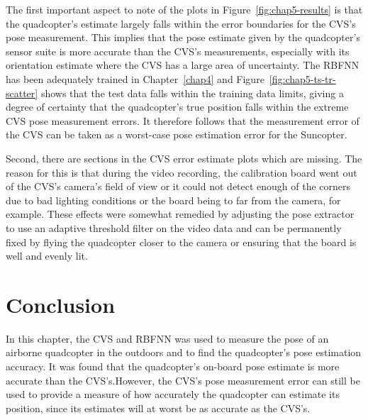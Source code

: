 The first important aspect to note of the plots in Figure~\ref{fig:chap5-results} is that the quadcopter's estimate largely falls within the error boundaries for the CVS's pose measurement. This implies that the pose estimate given by the quadcopter's sensor suite is more accurate than the CVS's measurements, especially with its orientation estimate where the CVS has a large area of uncertainty. The RBFNN has been adequately trained in Chapter~\ref{chap4} and Figure~\ref{fig:chap5-ts-tr-scatter} shows that the test data falls within the training data limits, giving a degree of certainty that the quadcopter's true position falls within the extreme CVS pose measurement errors. It therefore follows that the measurement error of the CVS can be taken as a worst-case pose estimation error for the Suncopter. 

Second, there are sections in the CVS error estimate plots which are missing. The reason for this is that during the video recording, the calibration board went out of the CVS's camera's field of view or it could not detect enough of the corners due to bad lighting conditions or the board being to far from the camera, for example. These effects were somewhat remedied by adjusting the pose extractor to use an adaptive threshold filter on the video data and can be permanently fixed by flying the quadcopter closer to the camera or ensuring that the board is well and evenly lit. 

\section{Conclusion}

In this chapter, the CVS and RBFNN was used to measure the pose of an airborne quadcopter in the outdoors and to find the quadcopter's pose estimation accuracy. It was found that the quadcopter's on-board pose estimate is more accurate than the CVS's.\@ However, the CVS's pose measurement error can still be used to provide a measure of how accurately the quadcopter can estimate its position, since its estimates will at worst be as accurate as the CVS's.\@ 
